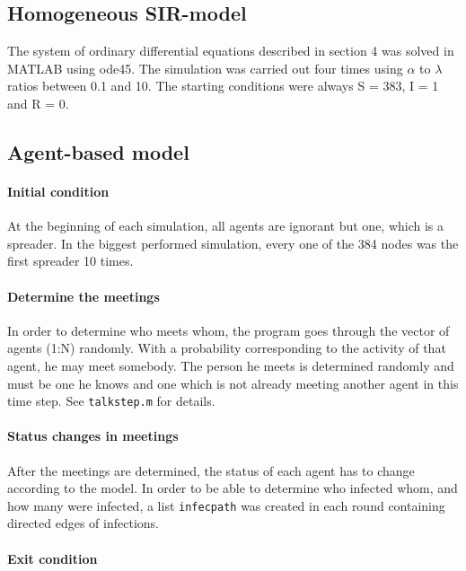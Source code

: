 \subsection{Homogeneous SIR-model}

The system of ordinary differential equations described in section 4 was solved in MATLAB using ode45. The simulation was carried out four times using $\alpha$ to $\lambda$ ratios between 0.1 and 10. The starting conditions were always S = 383, I = 1 and R = 0.

\subsection{Agent-based model}

\paragraph{Initial condition}

At the beginning of each simulation, all agents are ignorant but one, which is a spreader. In the biggest performed simulation, every one of the 384 nodes was the first spreader 10 times. 

\paragraph{Determine the meetings}
In order to determine who meets whom, the program goes through the vector of agents (1:N) randomly. With a probability corresponding to the activity of that agent, he may meet somebody. The person he meets is determined randomly and must be one he knows and one which is not already meeting another agent in this time step. See \texttt{talkstep.m} for details.

\paragraph{Status changes in meetings}

After the meetings are determined, the status of each agent has to change according to the model. In order to be able to determine who infected whom, and how many were infected, a list \texttt{infecpath} was created in each round containing directed edges of infections.




\paragraph{Exit condition}

